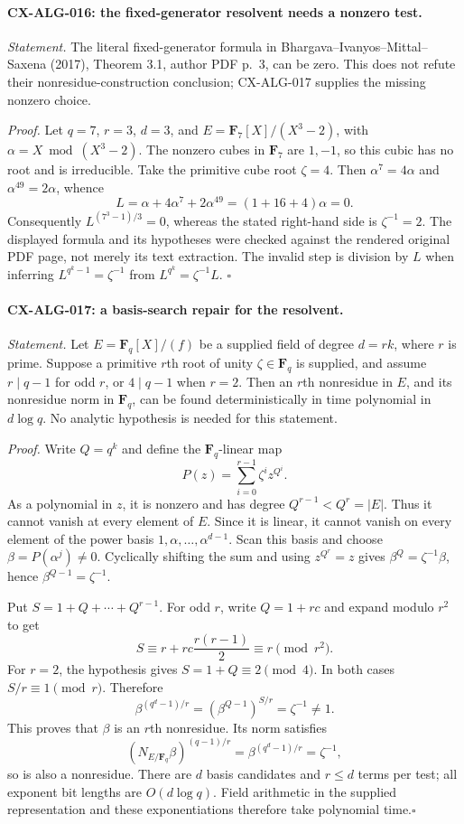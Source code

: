 \documentclass[11pt,a4paper]{article}
\begin{document}
\paragraph{CX-ALG-016: the fixed-generator resolvent needs a nonzero test.}
\emph{Statement.} The literal fixed-generator formula in
Bhargava--Ivanyos--Mittal--Saxena (2017), Theorem 3.1, author PDF p.~3,
can be zero. This does not refute their nonresidue-construction conclusion;
CX-ALG-017 supplies the missing nonzero choice.

\emph{Proof.} Let $q=7$, $r=3$, $d=3$, and
$E=\mathbf F_7[X]/(X^3-2)$, with $\alpha=X\bmod(X^3-2)$.
The nonzero cubes in $\mathbf F_7$ are $1,-1$, so this cubic has no root
and is irreducible. Take the primitive cube root $\zeta=4$. Then
$\alpha^7=4\alpha$ and $\alpha^{49}=2\alpha$, whence
\[
 L=\alpha+4\alpha^7+2\alpha^{49}
   =(1+16+4)\alpha=0.
\]
Consequently $L^{(7^3-1)/3}=0$, whereas the stated right-hand side is
$\zeta^{-1}=2$. The displayed formula and its hypotheses were checked
against the rendered original PDF page, not merely its text extraction.
The invalid step is division by $L$ when inferring
$L^{q^k-1}=\zeta^{-1}$ from $L^{q^k}=\zeta^{-1}L$.
\hfill$\square$

\paragraph{CX-ALG-017: a basis-search repair for the resolvent.}
\emph{Statement.} Let $E=\mathbf F_q[X]/(f)$ be a supplied field of degree
$d=rk$, where $r$ is prime. Suppose a primitive $r$th root of unity
$\zeta\in\mathbf F_q$ is supplied, and assume $r\mid q-1$ for odd $r$,
or $4\mid q-1$ when $r=2$. Then an $r$th nonresidue in $E$, and its
nonresidue norm in $\mathbf F_q$, can be found deterministically in time
polynomial in $d\log q$. No analytic hypothesis is needed for this statement.

\emph{Proof.} Write $Q=q^k$ and define the $\mathbf F_q$-linear map
\[
       P(z)=\sum_{i=0}^{r-1}\zeta^i z^{Q^i}.
\]
As a polynomial in $z$, it is nonzero and has degree
$Q^{r-1}<Q^r=|E|$. Thus it cannot vanish at every element of $E$.
Since it is linear, it cannot vanish on every element of the power basis
$1,\alpha,\ldots,\alpha^{d-1}$. Scan this basis and choose
$\beta=P(\alpha^j)\ne0$. Cyclically shifting the sum and using
$z^{Q^r}=z$ gives $\beta^Q=\zeta^{-1}\beta$, hence
$\beta^{Q-1}=\zeta^{-1}$.

Put $S=1+Q+\cdots+Q^{r-1}$. For odd $r$, write $Q=1+rc$ and expand
modulo $r^2$ to get
\[
 S\equiv r+rc\frac{r(r-1)}2\equiv r\pmod{r^2}.
\]
For $r=2$, the hypothesis gives $S=1+Q\equiv2\pmod4$.
In both cases $S/r\equiv1\pmod r$. Therefore
\[
 \beta^{(q^d-1)/r}
   =\left(\beta^{Q-1}\right)^{S/r}=\zeta^{-1}\ne1.
\]
This proves that $\beta$ is an $r$th nonresidue. Its norm satisfies
\[
 \left(N_{E/\mathbf F_q}\beta\right)^{(q-1)/r}
      =\beta^{(q^d-1)/r}=\zeta^{-1},
\]
so is also a nonresidue. There are $d$ basis candidates and $r\le d$
terms per test; all exponent bit lengths are $O(d\log q)$.
Field arithmetic in the supplied representation and these exponentiations
therefore take polynomial time.\hfill$\square$
\end{document}
